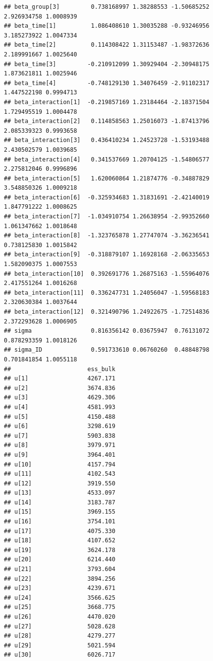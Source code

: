 \documentclass[
]{book}
\begin{document}
\begin{verbatim}
## beta_group[3]         0.738168997 1.38288553 -1.50685252  2.926934758 1.0008939
## beta_time[1]          1.086408610 1.30035288 -0.93246956  3.185273922 1.0047334
## beta_time[2]          0.114308422 1.31153487 -1.98372636  2.189991667 1.0025640
## beta_time[3]         -0.210912099 1.30929404 -2.30948175  1.873621811 1.0025946
## beta_time[4]         -0.748129130 1.34076459 -2.91102317  1.447522198 0.9994713
## beta_interaction[1]  -0.219857169 1.23184464 -2.18371504  1.729495519 1.0004478
## beta_interaction[2]   0.114858563 1.25016073 -1.87413796  2.085339323 0.9993658
## beta_interaction[3]   0.436410234 1.24523728 -1.53193488  2.430502579 1.0039685
## beta_interaction[4]   0.341537669 1.20704125 -1.54806577  2.275812046 0.9996896
## beta_interaction[5]   1.620060864 1.21874776 -0.34887829  3.548850326 1.0009218
## beta_interaction[6]  -0.325934683 1.31831691 -2.42140019  1.847791222 1.0008625
## beta_interaction[7]  -1.034910754 1.26638954 -2.99352660  1.061347662 1.0018648
## beta_interaction[8]  -1.323765878 1.27747074 -3.36236541  0.738125830 1.0015842
## beta_interaction[9]  -0.318879107 1.16928168 -2.06335653  1.582090375 1.0007553
## beta_interaction[10]  0.392691776 1.26875163 -1.55964076  2.417551264 1.0016268
## beta_interaction[11]  0.336247731 1.24056047 -1.59568183  2.320630384 1.0037644
## beta_interaction[12]  0.321490796 1.24922675 -1.72514836  2.372293628 1.0006905
## sigma                 0.816356142 0.03675947  0.76131072  0.878293359 1.0018126
## sigma_ID              0.591733610 0.06760260  0.48848798  0.701841854 1.0055118
##                      ess_bulk
## u[1]                 4267.171
## u[2]                 3674.836
## u[3]                 4629.306
## u[4]                 4581.993
## u[5]                 4150.488
## u[6]                 3298.619
## u[7]                 5903.838
## u[8]                 3979.971
## u[9]                 3964.401
## u[10]                4157.794
## u[11]                4102.543
## u[12]                3919.550
## u[13]                4533.097
## u[14]                3183.787
## u[15]                3969.155
## u[16]                3754.101
## u[17]                4075.330
## u[18]                4107.652
## u[19]                3624.178
## u[20]                6214.440
## u[21]                3793.604
## u[22]                3894.256
## u[23]                4239.671
## u[24]                3566.625
## u[25]                3668.775
## u[26]                4470.020
## u[27]                5028.628
## u[28]                4279.277
## u[29]                5021.594
## u[30]                6026.717

\end{verbatim}
\end{document}
